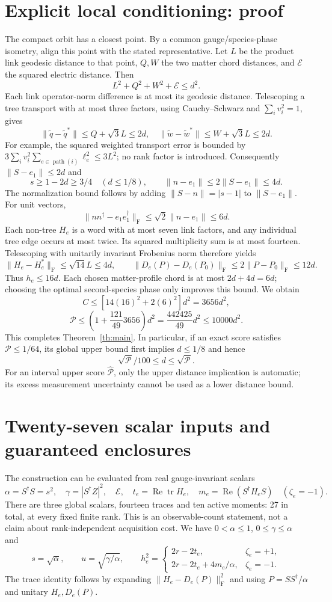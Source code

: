 \documentclass[11pt,a4paper]{article}
\newcommand{\tr}{\operatorname{tr}}\newcommand{\diag}{\operatorname{diag}}\newcommand{\Rea}{\operatorname{Re}}\newcommand{\Om}{\mathcal O_*}\newcommand{\F}{\mathrm F}
\begin{document}
\section{Explicit local conditioning: proof}
The compact orbit has a closest point. By a common gauge/species-phase isometry, align this point with the stated representative. Let $L$ be the product link geodesic distance to that point, $Q,W$ the two matter chord distances, and $\mathcal E$ the squared electric distance. Then
\[
L^2+Q^2+W^2+\mathcal E\le d^2.
\]
Each link operator-norm difference is at most its geodesic distance. Telescoping a tree transport with at most three factors, using Cauchy--Schwarz and $\sum_i v_i^2=1$, gives
\[
\|\widetilde q-\widetilde q^*\|\le Q+\sqrt3L\le2d,
\quad \|\widetilde w-\widetilde w^*\|\le W+\sqrt3L\le2d.
\]
For example, the squared weighted transport error is bounded by
$3\sum_i v_i^2\sum_{e\in\operatorname{path}(i)}\ell_e^2\le3L^2$; no rank factor is introduced. Consequently $\|S-e_1\|\le2d$ and
\[
s\ge1-2d\ge3/4\quad(d\le1/8),\qquad
\|n-e_1\|\le2\|S-e_1\|\le4d.
\]
The normalization bound follows by adding $\|S-n\|=|s-1|$ to $\|S-e_1\|$. For unit vectors,
\[
\|nn^\dagger-e_1e_1^\dagger\|_\F
\le\sqrt2\|n-e_1\|\le6d.
\]
Each non-tree $H_e$ is a word with at most seven link factors, and any individual tree edge occurs at most twice. Its squared multiplicity sum is at most fourteen. Telescoping with unitarily invariant Frobenius norm therefore yields
\[
\|H_e-H_e^*\|_\F\le\sqrt{14}L\le4d,
\qquad \|D_e(P)-D_e(P_0)\|_\F\le2\|P-P_0\|_\F\le12d.
\]
Thus $h_e\le16d$. Each chosen matter-profile chord is at most $2d+4d=6d$; choosing the optimal second-species phase only improves this bound. We obtain
\[
C\le[14(16)^2+2(6)^2]d^2=3656d^2,
\]
\[
\mathcal P\le\left(1+\frac{121}{49}3656\right)d^2
=\frac{442425}{49}d^2\le10000d^2.
\]
This completes Theorem~\ref{th:main}. In particular, if an exact score satisfies $\mathcal P\le1/64$, its global upper bound first implies $d\le1/8$ and hence
\[
\sqrt{\mathcal P}/100\le d\le\sqrt{\mathcal P}.
\]
For an interval upper score $\widehat{\mathcal P}$, only the upper distance implication is automatic; its excess measurement uncertainty cannot be used as a lower distance bound.
\newpage
\section{Twenty-seven scalar inputs and guaranteed enclosures}
The construction can be evaluated from real gauge-invariant scalars
\[
\alpha=S^\dagger S=s^2,\quad \gamma=|S^\dagger Z|^2,
\quad\mathcal E,\quad t_e=\Rea\tr H_e,
\quad m_e=\Rea(S^\dagger H_eS)\quad(\zeta_e=-1).
\]
There are three global scalars, fourteen traces and ten active moments: 27 in total, at every fixed finite rank. This is an observable-count statement, not a claim about rank-independent acquisition cost. We have $0<\alpha\le1$, $0\le\gamma\le\alpha$ and
\[
s=\sqrt\alpha,\qquad u=\sqrt{\gamma/\alpha},\qquad
h_e^2=\begin{cases}
2r-2t_e,&\zeta_e=+1,\\
2r-2t_e+4m_e/\alpha,&\zeta_e=-1.
\end{cases}
\]
The trace identity follows by expanding $\|H_e-D_e(P)\|_\F^2$ and using $P=SS^\dagger/\alpha$ and unitary $H_e,D_e(P)$.
\end{document}
